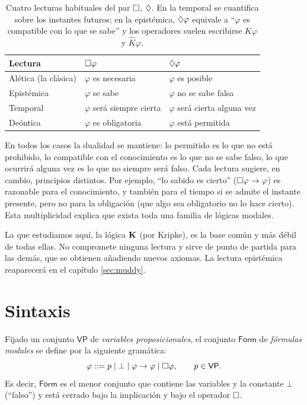 \begin{table}[htb]
\centering
\begin{tabular}{@{}lll@{}}
\toprule
Lectura & $\square\varphi$ & $\lozenge\varphi$\\
\midrule
Alética (la clásica) & $\varphi$ es necesaria & $\varphi$ es posible\\
Epistémica & $\varphi$ se sabe & $\varphi$ no se sabe falsa\\
Temporal & $\varphi$ será siempre cierta & $\varphi$ será cierta alguna vez\\
Deóntica & $\varphi$ es obligatoria & $\varphi$ está permitida\\
\bottomrule
\end{tabular}
\caption{Cuatro lecturas habituales del par $\square$, $\lozenge$. En la temporal se cuantifica sobre los instantes futuros; en la epistémica, $\lozenge\varphi$ equivale a ``$\varphi$ es compatible con lo que se sabe'' y los operadores suelen escribirse $K\varphi$ y $\widehat{K}\varphi$.}
\label{tab:lecturas}
\end{table}

En todos los casos la dualidad se mantiene: lo permitido es lo que no está prohibido, lo compatible con el conocimiento es lo que no se sabe falso, lo que ocurrirá alguna vez es lo que no siempre será falso. Cada lectura sugiere, en cambio, principios distintos. Por ejemplo, ``lo sabido es cierto'' ($\square\varphi \to \varphi$) es razonable para el conocimiento, y también para el tiempo si se admite el instante presente, pero no para la obligación (que algo sea obligatorio no lo hace cierto). Esta multiplicidad explica que exista toda una familia de lógicas modales.

La que estudiamos aquí, la lógica $\mathbf{K}$ (por Kripke), es la base común y más débil de todas ellas. No compromete ninguna lectura y sirve de punto de partida para las demás, que se obtienen añadiendo nuevos axiomas. La lectura epistémica reaparecerá en el capítulo \ref{sec:muddy}.

\section{Sintaxis}\label{sec:sintaxis-mat}

\begin{definicion}\label{def:lenguaje}
Fijado un conjunto $\mathsf{VP}$ de \emph{variables proposicionales}, el conjunto $\mathsf{Form}$ de \emph{fórmulas modales} se define por la siguiente gramática:
\[
  \varphi ::= p \mid \bot \mid \varphi \to \varphi \mid \square\varphi,
  \qquad p \in \mathsf{VP}.
\]
Es decir, $\mathsf{Form}$ es el menor conjunto que contiene las variables y la constante $\bot$ (``falso'') y está cerrado bajo la implicación y bajo el operador $\square$.
\end{definicion}

